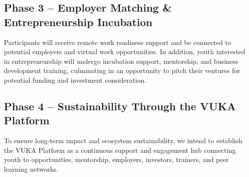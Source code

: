 \documentclass[11pt,a4paper]{article}
\begin{document}
\subsection{Phase 3 -- Employer Matching \& Entrepreneurship Incubation}
\noindent Participants will receive remote work readiness support and be connected to potential employers and virtual work opportunities. In addition, youth interested in entrepreneurship will undergo incubation support, mentorship, and business development training, culminating in an opportunity to pitch their ventures for potential funding and investment consideration.

\subsection{Phase 4 -- Sustainability Through the VUKA Platform}
\noindent To ensure long-term impact and ecosystem sustainability, we intend to establish the VUKA Platform as a continuous support and engagement hub connecting youth to opportunities, mentorship, employers, investors, trainers, and peer learning networks.
\end{document}

